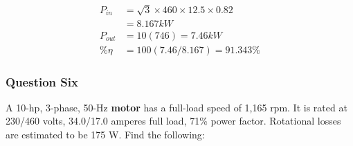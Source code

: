 \documentclass[a4paper,11pt]{article}
\begin{document}
\begin{align*}
    P_{in}  & =\sqrt{3}\times460\times12.5\times0.82 \\
            & = 8.167kW                              \\
    P_{out} & = 10(746) = 7.46kW                     \\
    \%\eta  & = 100(7.46/8.167)=91.343\%
\end{align*}

\subsubsection*{Question Six}

A 10-hp, 3-phase, 50-Hz \textbf{motor} has a full-load speed of 1,165 rpm. It is rated at 230/460 volts, 34.0/17.0 amperes full load, 71\% power factor. Rotational losses are estimated to be 175 W. Find the following:
\end{document}
